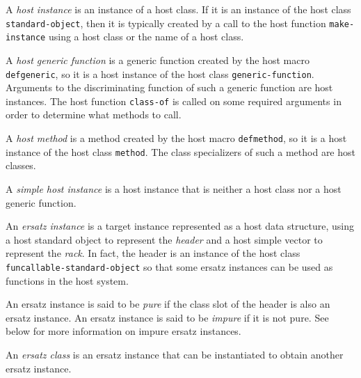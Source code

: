\begin{definition}
A \emph{host instance} is an instance of a host class.  If it is an
instance of the host class \texttt{standard-object}, then it is
typically created by a call to the host function
\texttt{make-instance} using a host class or the name of a host class.
\end{definition}

\begin{definition}
A \emph{host generic function} is a generic function created by the
host macro \texttt{defgeneric}, so it is a host instance of the host
class \texttt{generic-function}.  Arguments to the discriminating
function of such a generic function are host instances.  The host
function \texttt{class-of} is called on some required arguments in
order to determine what methods to call.
\end{definition}

\begin{definition}
A \emph{host method} is a method created by the host macro
\texttt{defmethod}, so it is a host instance of the host class
\texttt{method}.  The class specializers of such a method are host
classes.
\end{definition}

\begin{definition}
A \emph{simple host instance} is a host instance that is neither a
host class nor a host generic function.
\end{definition}

\begin{definition}
An \emph{ersatz instance} is a target instance represented as a host
data structure, using a host standard object to represent the
\emph{header} and a host simple vector to represent the \emph{rack}.
In fact, the header is an instance of the host class
\texttt{funcallable-standard-object} so that some ersatz instances can
be used as functions in the host system.
\end{definition}

\begin{definition}
An ersatz instance is said to be \emph{pure} if the class slot of the
header is also an ersatz instance.  An ersatz instance is said to be
\emph{impure} if it is not pure.  See below for more information on
impure ersatz instances.
\end{definition}

\begin{definition}
An \emph{ersatz class} is an ersatz instance that can be instantiated
to obtain another ersatz instance.
\end{definition}

